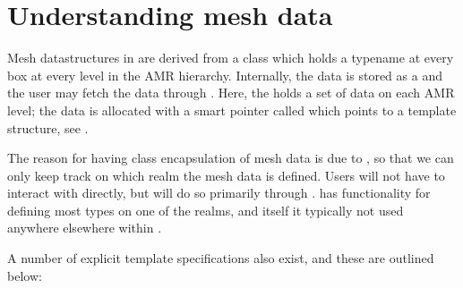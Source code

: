 \documentclass[letterpaper,10pt,english]{sphinxmanual}
\begin{document}
\section{Understanding mesh data}
\label{\detokenize{MeshData:understanding-mesh-data}}\label{\detokenize{MeshData:chap-meshdata}}\label{\detokenize{MeshData::doc}}
Mesh datastructures in  are derived from a class  which holds a typename  at every box at every level in the AMR hierarchy.
Internally, the data is stored as a  and the user may fetch the data through .
Here, the  holds a set of data on each AMR level; the data is allocated with a smart pointer called  which points to a  template structure, see {\hyperref[\detokenize{Basics:chap-basics}]{}}.

The reason for having class encapsulation of mesh data is due to {\hyperref[\detokenize{Realm:chap-realm}]{}}, so that we can only keep track on which realm the mesh data is defined.
Users will not have to interact with  directly, but will do so primarily through .
 has functionality for defining most  types on one of the realms, and  itself it typically not used anywhere elsewhere within .

A number of explicit template specifications also exist, and these are outlined below:
\end{document}
